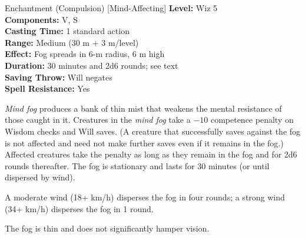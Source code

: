 {Enchantment (Compulsion) [Mind-Affecting]}
{
	\textbf{Level:}
	Wiz 5\\
	\textbf{Components:}
	V, S\\
	\textbf{Casting Time:}
	1 standard action\\
	\textbf{Range:}
	Medium (30 m + 3 m/level)\\
	\textbf{Effect:}
	Fog spreads in 6-m radius, 6 m high\\
	\textbf{Duration:}
	30 minutes and 2d6 rounds; see text\\
	\textbf{Saving Throw:}
	Will negates\\
	\textbf{Spell Resistance:}
	Yes\\
}
{
	\emph{Mind fog} produces a bank of thin mist that weakens the mental resistance of those caught in it. Creatures in the \emph{mind fog} take a $-10$ competence penalty on Wisdom checks and Will saves. (A creature that successfully saves against the fog is not affected and need not make further saves even if it remains in the fog.) Affected creatures take the penalty as long as they remain in the fog and for 2d6 rounds thereafter. The fog is stationary and lasts for 30 minutes (or until dispersed by wind).

	A moderate wind (18+ km/h) disperses the fog in four rounds; a strong wind (34+ km/h) disperses the fog in 1 round.

	The fog is thin and does not significantly hamper vision.

}

